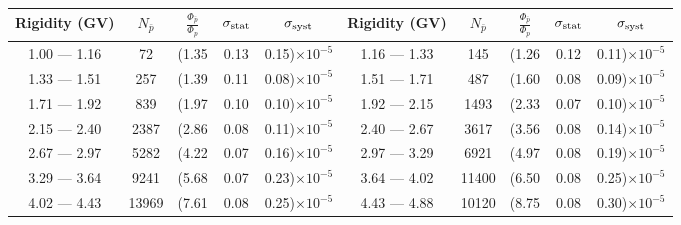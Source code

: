 \begin{table}[p] 
\renewcommand\baselinestretch{1.3}\selectfont
\setlength\tabcolsep{3pt}  %
\centering
\begin{tabular}{c|c|ccc  c|c|ccc}
\hline
\textbf{Rigidity}  (GV)  & $N_{\bar{p}}$ & $\frac{\Phi_{\bar{p}}}{\Phi_{p}}$ & $\sigma_{\rm{stat}}$ & $\sigma_{\rm{syst}}$ \hspace{1cm}  & \textbf{Rigidity}  (GV)  & $N_{\bar{p}}$ & $\frac{\Phi_{\bar{p}}}{\Phi_{p}}$ & $\sigma_{\rm{stat}}$ & $\sigma_{\rm{syst}}$ \hspace{1cm} \\ 
\hline
1.00 — 1.16  &  72                      &(1.35                                &  0.13                   &      0.15)$\times 10^{-5}$  & 1.16 — 1.33  &  145                    &(1.26                                &  0.12                   &      0.11)$\times 10^{-5}$ \\
1.33 — 1.51  &  257                    &(1.39                                &  0.11                   &      0.08)$\times 10^{-5}$  & 1.51 — 1.71  &  487                    &(1.60                                &  0.08                   &      0.09)$\times 10^{-5}$ \\
1.71 — 1.92  &  839                    &(1.97                                &  0.10                   &      0.10)$\times 10^{-5}$  & 1.92 — 2.15  &  1493                  &(2.33                                &  0.07                   &      0.10)$\times 10^{-5}$ \\
2.15 — 2.40  &  2387                  &(2.86                                &  0.08                   &      0.11)$\times 10^{-5}$  & 2.40 — 2.67  &  3617                  &(3.56                                &  0.08                   &      0.14)$\times 10^{-5}$ \\
2.67 — 2.97  &  5282                  &(4.22                                &  0.07                   &      0.16)$\times 10^{-5}$  & 2.97 — 3.29  &  6921                  &(4.97                                &  0.08                   &      0.19)$\times 10^{-5}$ \\
3.29 — 3.64  &  9241                  &(5.68                                &  0.07                   &      0.23)$\times 10^{-5}$  & 3.64 — 4.02  &  11400                &(6.50                                &  0.08                   &      0.25)$\times 10^{-5}$ \\
4.02 — 4.43  &  13969                &(7.61                                &  0.08                   &      0.25)$\times 10^{-5}$  & 4.43 — 4.88  &  10120                &(8.75                                &  0.08                   &      0.30)$\times 10^{-5}$ \\

\end{tabular}
\end{table}
